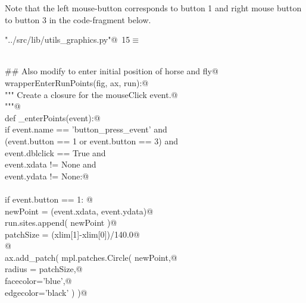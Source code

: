 \documentclass[11.5pt]{report}
\begin{document}
Note that the left mouse-button corresponds to button 1 and right mouse button
to button 3 in the code-fragment below. 

\begin{flushleft} \small\label{scrap5}\raggedright\small
{} \verb@"../src/lib/utils_graphics.py"@\nobreak\ {\footnotesize {15}}$\equiv$
\vspace{-1ex}
\begin{list}{}{} \item
\mbox{}\verb@@\\
\mbox{}\verb@## Also modify to enter initial position of horse and fly@\\
\mbox{}\verb@def wrapperEnterRunPoints(fig, ax, run):@\\
\mbox{}\verb@    """ Create a closure for the mouseClick event.@\\
\mbox{}\verb@    """@\\
\mbox{}\verb@    def _enterPoints(event):@\\
\mbox{}\verb@        if event.name     == 'button_press_event'      and \@\\
\mbox{}\verb@           (event.button   == 1 or event.button == 3)  and \@\\
\mbox{}\verb@           event.dblclick == True                      and \@\\
\mbox{}\verb@           event.xdata    != None                      and \@\\
\mbox{}\verb@           event.ydata    != None:@\\
\mbox{}\verb@@\\
\mbox{}\verb@             if event.button == 1:        @\\
\mbox{}\verb@               newPoint = (event.xdata, event.ydata)@\\
\mbox{}\verb@               run.sites.append( newPoint  )@\\
\mbox{}\verb@               patchSize  = (xlim[1]-xlim[0])/140.0@\\
\mbox{}\verb@   @\\
\mbox{}\verb@               ax.add_patch( mpl.patches.Circle( newPoint,@\\
\mbox{}\verb@                                              radius = patchSize,@\\
\mbox{}\verb@                                              facecolor='blue',@\\
\mbox{}\verb@                                              edgecolor='black'   )  )@\\

\end{list}
\end{flushleft}
\end{document}
